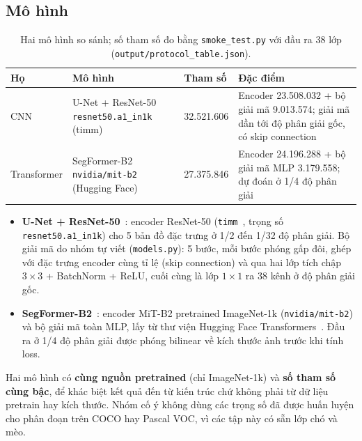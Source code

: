 \documentclass[12pt]{article}
\newcommand{\code}[1]{\texttt{#1}}
\newcommand{\st}[1]{\textbf{#1}}
\begin{document}
\subsection{Mô hình}
\begin{table}[H]
\centering
\caption{Hai mô hình so sánh; số tham số đo bằng \code{smoke\_test.py} với đầu ra 38 lớp (\code{output/protocol\_table.json}).}\label{tab:models}
\begin{tabularx}{\linewidth}{@{}P{2.4cm}P{4.4cm}R{2.3cm}L@{}}
\toprule
Họ & Mô hình & Tham số & Đặc điểm \\\midrule
CNN & U-Net + ResNet-50 \newline \code{resnet50.a1\_in1k} (timm) & 32.521.606 & Encoder 23.508.032 + bộ giải mã 9.013.574; giải mã dần tới độ phân giải gốc, có skip connection \\
Transformer & SegFormer-B2 \newline \code{nvidia/mit-b2} (Hugging Face) & 27.375.846 & Encoder 24.196.288 + bộ giải mã MLP 3.179.558; dự đoán ở 1/4 độ phân giải \\
\bottomrule
\end{tabularx}
\end{table}

\begin{itemize}
  \item \st{U-Net + ResNet-50}~\cite{ronneberger2015,he2016}: encoder ResNet-50 (\code{timm}~\cite{timm}, trọng số
        \code{resnet50.a1\_in1k}) cho 5 bản đồ đặc trưng ở 1/2 đến 1/32 độ phân giải. Bộ giải mã do nhóm tự viết
        (\code{models.py}): 5 bước, mỗi bước phóng gấp đôi, ghép với đặc trưng encoder cùng tỉ lệ (skip connection) và qua hai
        lớp tích chập $3\times3$ + BatchNorm + ReLU, cuối cùng là lớp $1\times1$ ra 38 kênh ở độ phân giải gốc.
  \item \st{SegFormer-B2}~\cite{xie2021}: encoder MiT-B2 pretrained ImageNet-1k (\code{nvidia/mit-b2}) và bộ giải mã toàn MLP,
        lấy từ thư viện Hugging Face Transformers~\cite{wolf2020}. Đầu ra ở 1/4 độ phân giải được phóng bilinear về kích
        thước ảnh trước khi tính loss.
\end{itemize}
Hai mô hình có \st{cùng nguồn pretrained} (chỉ ImageNet-1k) và \st{số tham số cùng bậc}, để khác biệt kết quả đến từ kiến trúc
chứ không phải từ dữ liệu pretrain hay kích thước. Nhóm cố ý không dùng các trọng số đã được huấn luyện cho phân đoạn trên
COCO hay Pascal VOC, vì các tập này có sẵn lớp chó và mèo.
\end{document}
